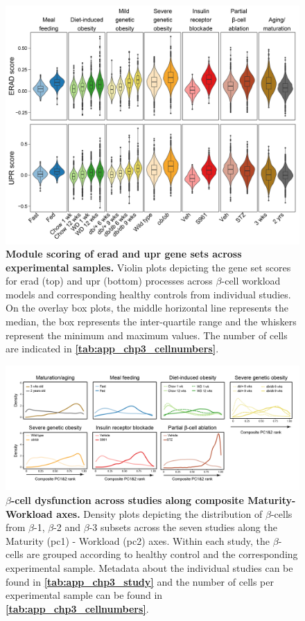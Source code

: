 \begin{figure}[H]
\centering
\includegraphics[width=12cm,keepaspectratio]{Appendix2/Fig/F3-22-02.png}
\caption[Module scoring of  and  gene sets across experimental samples]{\textbf{Module scoring of \gls{erad} and \gls{upr} gene sets across experimental samples.} Violin plots depicting the gene set scores for \gls{erad} (top) and \gls{upr} (bottom) processes across $\beta$-cell workload models and corresponding healthy controls from individual studies. On the overlay box plots, the middle horizontal line represents the median, the box represents the inter-quartile range and the whiskers represent the minimum and maximum values. The number of cells are indicated in \textbf{\autoref{tab:app_chp3_cellnumbers}}.}
\vspace{-25pt}
\label{fig:app_chp3_eradupr}
\end{figure}


\begin{figure}[H]
\centering
\includegraphics[width=\linewidth]{Appendix2/Fig/F3-7-01.png}
\caption[$\beta$-cell dysfunction across studies along Maturity-Workload axes]{\textbf{$\beta$-cell dysfunction across studies along composite Maturity-Workload axes.} Density plots depicting the distribution of $\beta$-cells from $\beta$-1, $\beta$-2 and $\beta$-3 subsets across the seven studies along the Maturity (\gls{pc}1) - Workload (\gls{pc}2) axes. Within each study, the $\beta$-cells are grouped according to healthy control and the corresponding experimental sample. Metadata about the individual studies can be found in \textbf{\autoref{tab:app_chp3_study}} and the number of cells per experimental sample can be found in \textbf{\autoref{tab:app_chp3_cellnumbers}}.}
\label{fig:app_chp3_pc12}
\end{figure}


